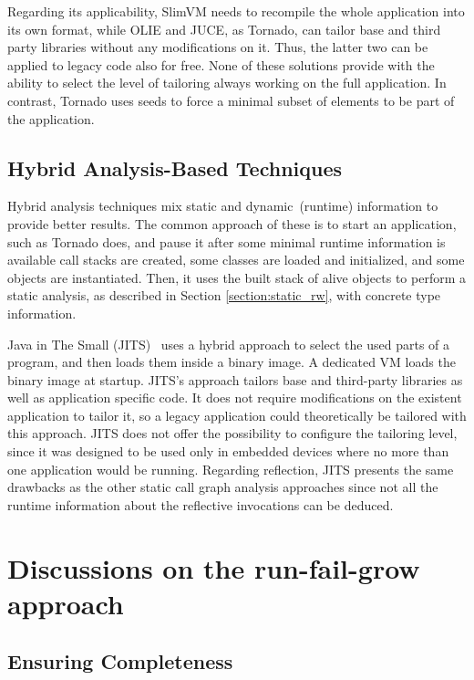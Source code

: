 Regarding its applicability, SlimVM needs to recompile the whole application into its own format, while OLIE and JUCE, as Tornado, can tailor base and third party libraries without any modifications on it. Thus, the latter two can be applied to legacy code also for free. None of these solutions provide with the ability to select the level of tailoring always working on the full application. In contrast, Tornado uses seeds to force a minimal subset of elements to be part of the application.


\subsection{Hybrid Analysis-Based Techniques}\label{section:hybrid_rw}

Hybrid analysis techniques mix static and dynamic~(\ie runtime) information to provide better results. The common approach of these is to start an application, such as Tornado does, and pause it after some minimal runtime information is available \ie call stacks are created, some classes are loaded and initialized, and some objects are instantiated. Then, it uses the built stack of alive objects to perform a static analysis, as described in Section \ref{section:static_rw}, with concrete type information.

Java in The Small (JITS)~\cite{Cour10a} uses a hybrid approach to select the used parts of a program, and then loads them inside a binary image. A dedicated VM loads the binary image at startup. JITS's approach tailors base and third-party libraries as well as application specific code. It does not require modifications on the existent application to tailor it, so a legacy application could theoretically be tailored with this approach. JITS does not offer the possibility to configure the tailoring level, since it was designed to be used only in embedded devices where no more than one application would be running. Regarding reflection, JITS presents the same drawbacks as the other static call graph analysis approaches since not all the runtime information about the reflective invocations can be deduced.

\section{Discussions on the run-fail-grow approach} \label{sec:discussion}

\subsection{Ensuring Completeness} \label{section:safety}

